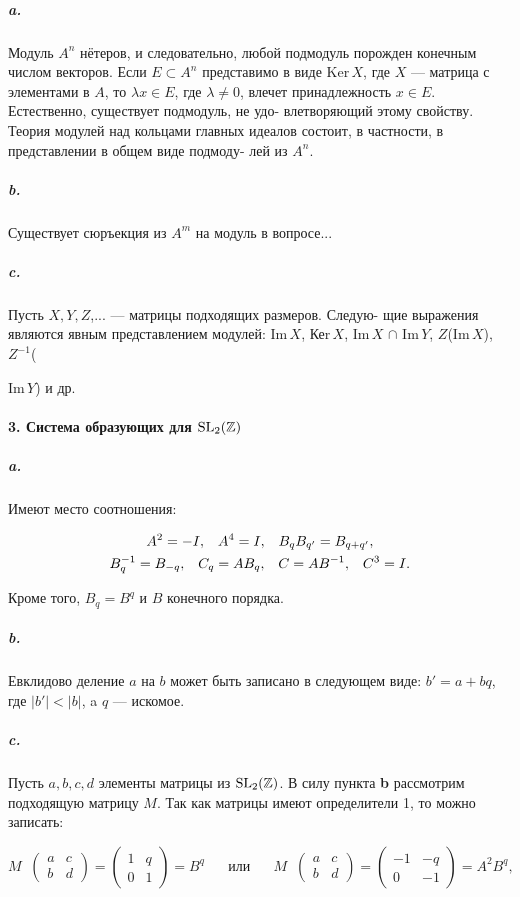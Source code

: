 \documentclass{mai_book}
\begin{document}
\subparagraph{a.} Модуль $A^{n}$ нётеров, и следовательно, любой подмодуль порожден
конечным числом векторов. Если $E \subset A^{n}$ представимо в виде Ker\,{$X$},
где $X$ --- матрица с элементами в $A$, то $\lambda{x} \in E$, где $\lambda \neq 0$, влечет
принадлежность $x \in E$. Естественно, существует подмодуль, не удо-
влетворяющий этому свойству. Теория модулей над кольцами главных
идеалов состоит, в частности, в представлении в общем виде подмоду-
лей из $A^{n}$.

\subparagraph{b.} Существует сюръекция из $A^{m}$ на модуль в вопросе...

\subparagraph{c.} Пусть $X, Y, Z$,... --- матрицы подходящих размеров. Следую-
щие выражения являются явным представлением модулей: Im\,{$X$}, Кеr\,{$X$},
Im\,{$X$} $\cap$ Im\,{$Y$}, $Z$(Im\,{$X$}), $Z^{-1}$({Im\,{$Y$}) и др.

\paragraph{3. Система образующих для $\rm{SL_{2}}(\mathbb {Z})$}

\subparagraph{\bf a.} Имеют место соотношения:

\begin{gather*}
A^{2} = -I,\;\;\;A^{4} = I,\;\;\;B_{q}B_{q'} = B_{q+q'}, \\
B^{-1}_{q} = B_{-q},\;\;\;C_{q} = AB_{q},\;\;\;C = AB^{-1},\;\;\;C^{3} = I.  \notag
\end{gather*}

\noindent Кроме того, $B_{q} = B^{q}$ и $B$ конечного порядка.

\subparagraph{b.} Евклидово деление $a$ на $b$ может быть записано в следующем виде:
$b' = a + bq$, где $|b'| < |b|$, a $q$ --- искомое.


\restoretop
{}

\subparagraph{c.} Пусть $a, b, c, d$ элементы матрицы из $\rm{SL_{2}}(\mathbb {Z})$. В силу пункта {\bf b} рассмотрим подходящую матрицу $M$. Так как матрицы имеют определители 1, то можно записать:

\begin{equation*}
M\;\;{\begin{pmatrix} a & c \\ b & d \end{pmatrix}} = \begin{pmatrix} 1 & q \\ 0 & 1 \end{pmatrix} = B^{q}\;\;\;\;\;\;\text{или}\;\;\;\;\;\;M\;\;{\begin{pmatrix} a & c \\ b & d \end{pmatrix}} = \begin{pmatrix} -1 & -q \\ 0 & -1 \end{pmatrix} = A^{2}B^{q},
\end{equation*}

}
\end{document}
